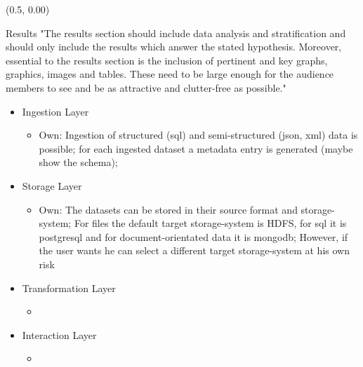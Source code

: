 \documentclass[12pt]{beamer}
\begin{document}
\begin{textblock}{0.5}(0.5, 0.00)


\begin{block}{Results}
"The results section should include data analysis and stratification and should only include the results which answer the stated hypothesis. Moreover, essential to the results section is the inclusion of pertinent and key graphs, graphics, images and tables. These need to be large enough for the audience members to see and be as attractive and clutter-free as possible."
\begin{itemize}
\item Ingestion Layer
\begin{itemize}
\item Own: Ingestion of structured (sql) and semi-structured (json, xml) data is possible; for each ingested dataset a metadata entry is generated (maybe show the schema); 
\end{itemize}
\item Storage Layer
\begin{itemize}
\item Own: The datasets can be stored in their source format and storage-system; For files the default target storage-system is HDFS, for sql it is postgresql and for document-orientated data it is mongodb; However, if the user wants he can select a different target storage-system at his own risk
\end{itemize}
\item Transformation Layer
\begin{itemize}
\item 
\end{itemize}
\item Interaction Layer
\begin{itemize}
\item 
\end{itemize}
\end{itemize} 
\end{block}


\end{textblock}
\end{document}

